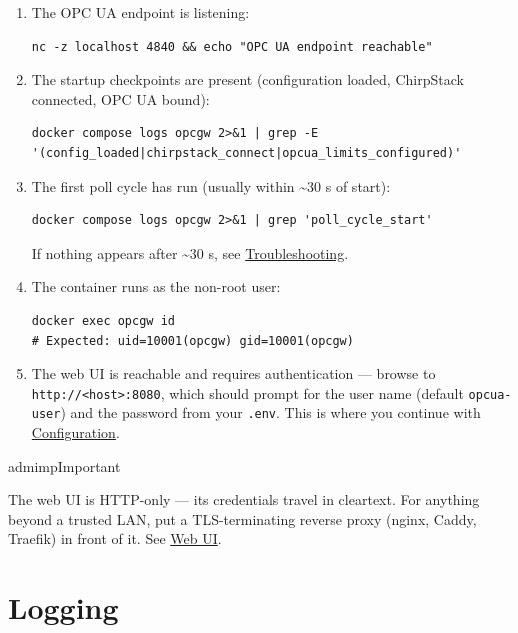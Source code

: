 \begin{enumerate}
\def\labelenumi{\arabic{enumi}.}
\item
  The OPC UA endpoint is listening:

\begin{lstlisting}
nc -z localhost 4840 && echo "OPC UA endpoint reachable"
\end{lstlisting}
\item
  The startup checkpoints are present (configuration loaded, ChirpStack connected, OPC UA bound):

\begin{lstlisting}
docker compose logs opcgw 2>&1 | grep -E '(config_loaded|chirpstack_connect|opcua_limits_configured)'
\end{lstlisting}
\item
  The first poll cycle has run (usually within \textasciitilde30 s of start):

\begin{lstlisting}
docker compose logs opcgw 2>&1 | grep 'poll_cycle_start'
\end{lstlisting}

  If nothing appears after \textasciitilde30 s, see \hyperref[ch-troubleshooting]{Troubleshooting}.
\item
  The container runs as the non-root user:

\begin{lstlisting}
docker exec opcgw id
# Expected: uid=10001(opcgw) gid=10001(opcgw)
\end{lstlisting}
\item
  The web UI is reachable and requires authentication --- browse to \texttt{http://\textless{}host\textgreater{}:8080}, which should prompt for the user name (default \texttt{opcua-user}) and the password from your \texttt{.env}. This is where you continue with \hyperref[ch-configuration]{Configuration}.
\end{enumerate}

\begin{admonition}{admimp}{Important}

The web UI is HTTP-only --- its credentials travel in cleartext. For anything beyond a trusted LAN, put a TLS-terminating reverse proxy (nginx, Caddy, Traefik) in front of it. See \hyperref[sec-web-config]{Web UI}.

\end{admonition}

\section{Logging}\label{sec-install-logging}

